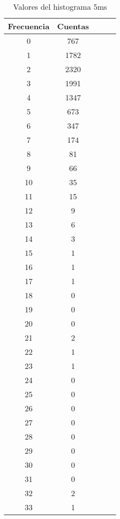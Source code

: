 \begin{center}
\begin{table}[H]
\caption{Valores del histograma 5ms}
\label{Tab:histo_5s}
\begin{tabular}{ccccc}
\toprule
Frecuencia & Cuentas \\
\midrule
\num{    0} & \num{  767} \\
\num{    1} & \num{ 1782} \\
\num{    2} & \num{ 2320} \\
\num{    3} & \num{ 1991} \\
\num{    4} & \num{ 1347} \\
\num{    5} & \num{  673} \\
\num{    6} & \num{  347} \\
\num{    7} & \num{  174} \\
\num{    8} & \num{   81} \\
\num{    9} & \num{   66} \\
\num{   10} & \num{   35} \\
\num{   11} & \num{   15} \\
\num{   12} & \num{    9} \\
\num{   13} & \num{    6} \\
\num{   14} & \num{    3} \\
\num{   15} & \num{    1} \\
\num{   16} & \num{    1} \\
\num{   17} & \num{    1} \\
\num{   18} & \num{    0} \\
\num{   19} & \num{    0} \\
\num{   20} & \num{    0} \\
\num{   21} & \num{    2} \\
\num{   22} & \num{    1} \\
\num{   23} & \num{    1} \\
\num{   24} & \num{    0} \\
\num{   25} & \num{    0} \\
\num{   26} & \num{    0} \\
\num{   27} & \num{    0} \\
\num{   28} & \num{    0} \\
\num{   29} & \num{    0} \\
\num{   30} & \num{    0} \\
\num{   31} & \num{    0} \\
\num{   32} & \num{    2} \\
\num{   33} & \num{    1} \\

\end{tabular}
\end{table}
\end{center}
